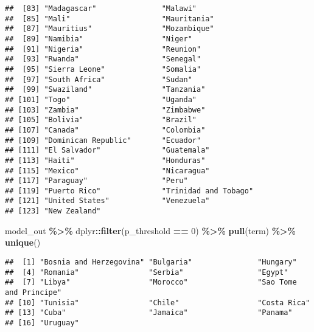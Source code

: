 \documentclass[
]{book}
\newenvironment{Shaded}{\begin{snugshade}}{\end{snugshade}}
\newcommand{\DecValTok}[1]{\textcolor[rgb]{0.00,0.00,0.81}{#1}}
\newcommand{\KeywordTok}[1]{\textcolor[rgb]{0.13,0.29,0.53}{\textbf{#1}}}
\newcommand{\NormalTok}[1]{#1}
\newcommand{\OperatorTok}[1]{\textcolor[rgb]{0.81,0.36,0.00}{\textbf{#1}}}
\newcommand{\StringTok}[1]{\textcolor[rgb]{0.31,0.60,0.02}{#1}}
\begin{document}
\begin{verbatim}
##  [83] "Madagascar"               "Malawi"                  
##  [85] "Mali"                     "Mauritania"              
##  [87] "Mauritius"                "Mozambique"              
##  [89] "Namibia"                  "Niger"                   
##  [91] "Nigeria"                  "Reunion"                 
##  [93] "Rwanda"                   "Senegal"                 
##  [95] "Sierra Leone"             "Somalia"                 
##  [97] "South Africa"             "Sudan"                   
##  [99] "Swaziland"                "Tanzania"                
## [101] "Togo"                     "Uganda"                  
## [103] "Zambia"                   "Zimbabwe"                
## [105] "Bolivia"                  "Brazil"                  
## [107] "Canada"                   "Colombia"                
## [109] "Dominican Republic"       "Ecuador"                 
## [111] "El Salvador"              "Guatemala"               
## [113] "Haiti"                    "Honduras"                
## [115] "Mexico"                   "Nicaragua"               
## [117] "Paraguay"                 "Peru"                    
## [119] "Puerto Rico"              "Trinidad and Tobago"     
## [121] "United States"            "Venezuela"               
## [123] "New Zealand"
\end{verbatim}

\begin{Shaded}
\begin{Highlighting}[]
\NormalTok{model\_out }\OperatorTok{\%\textgreater{}\%}
\StringTok{  }\NormalTok{dplyr}\OperatorTok{::}\KeywordTok{filter}\NormalTok{(p\_threshold }\OperatorTok{==}\StringTok{ }\DecValTok{0}\NormalTok{) }\OperatorTok{\%\textgreater{}\%}
\StringTok{  }\KeywordTok{pull}\NormalTok{(term) }\OperatorTok{\%\textgreater{}\%}
\StringTok{  }\KeywordTok{unique}\NormalTok{()}
\end{Highlighting}
\end{Shaded}

\begin{verbatim}
##  [1] "Bosnia and Herzegovina" "Bulgaria"               "Hungary"               
##  [4] "Romania"                "Serbia"                 "Egypt"                 
##  [7] "Libya"                  "Morocco"                "Sao Tome and Principe" 
## [10] "Tunisia"                "Chile"                  "Costa Rica"            
## [13] "Cuba"                   "Jamaica"                "Panama"                
## [16] "Uruguay"
\end{verbatim}
\end{document}
